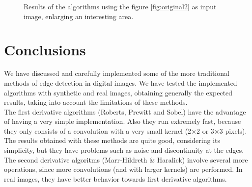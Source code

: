 \documentclass{ipol}
\numberwithin{equation}{section}
\numberwithin{table}{section}
\numberwithin{figure}{section}
\begin{document}
\begin{figure}[h!]
	\quad
	\caption{Results of the algorithms using the figure \ref{fig:original2} as input image, enlarging an interesting area.}
	\label{fig:result3}
\end{figure}

\clearpage
\section{Conclusions}
\label{sec:conclusions}

We have discussed and carefully implemented some of the more traditional methods of edge detection in digital images. We have tested the implemented algorithms with synthetic and real images, obtaining generally the expected results, taking into account the limitations of these methods. \\

The first derivative algorithms (Roberts, Prewitt and Sobel) have the advantage of having a very simple implementation. Also they run extremely fast, because they only consists of a convolution with a very small kernel (2$\times$2 or 3$\times$3 pixels). The results obtained with these methods are quite good, considering its simplicity, but they have problems such as noise and discontinuity at the edges. \\

The second derivative algoritms (Marr-Hildreth \& Haralick) involve several more operations, since more convolutions (and with larger kernels) are performed. In real images, they have better behavior towards first derivative algorithms. \\
\end{document}
